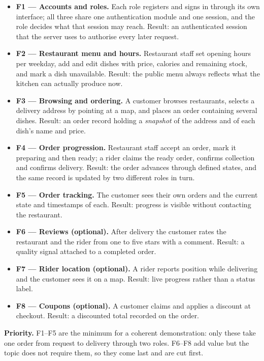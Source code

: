 \begin{itemize}
\item \textbf{F1 --- Accounts and roles.} Each role registers and signs in through its own
interface; all three share one authentication module and one session, and the role decides what that
session may reach. Result: an authenticated session that the server uses to
authorise every later request.
\item \textbf{F2 --- Restaurant menu and hours.} Restaurant staff set opening hours per weekday,
add and edit dishes with price, calories and remaining stock, and mark a dish unavailable.
Result: the public menu always reflects what the kitchen can actually produce now.
\item \textbf{F3 --- Browsing and ordering.} A customer browses restaurants, selects a delivery
address by pointing at a map, and places an order containing several dishes. Result: an order
record holding a \emph{snapshot} of the address and of each dish's name and price.
\item \textbf{F4 --- Order progression.} Restaurant staff accept an order, mark it preparing and
then ready; a rider claims the ready order, confirms collection and confirms delivery. Result:
the order advances through defined states, and the same record is updated by two different
roles in turn.
\item \textbf{F5 --- Order tracking.} The customer sees their own orders and the current state
and timestamps of each. Result: progress is visible without contacting the restaurant.
\item \textbf{F6 --- Reviews (optional).} After delivery the customer rates the restaurant and
the rider from one to five stars with a comment. Result: a quality signal attached to a
completed order.
\item \textbf{F7 --- Rider location (optional).} A rider reports position while delivering and
the customer sees it on a map. Result: live progress rather than a status label.
\item \textbf{F8 --- Coupons (optional).} A customer claims and applies a discount at checkout.
Result: a discounted total recorded on the order.
\end{itemize}

\noindent\textbf{Priority.} F1--F5 are the minimum for a coherent demonstration: only these
take one order from request to delivery through two roles. F6--F8 add value but the topic does
not require them, so they come last and are cut first.

